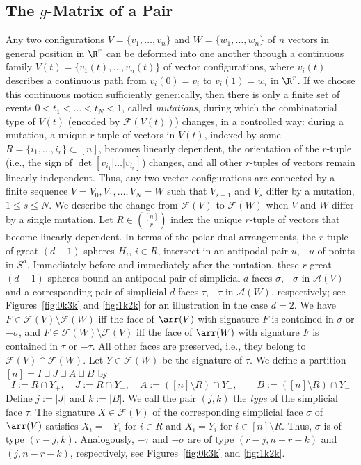 \subsection{The $g$-Matrix of a Pair}
\label{sec:g-pair}
%
Any two configurations $V=\{v_1,\dots,v_n\}$ and $W=\{w_1,\dots,w_n\}$ of $n$ vectors in general position in $\R^r$ can be deformed into one another through a continuous family $V(t)=\{v_1(t),\dots,v_n(t)\}$ of vector configurations, where $v_i(t)$ describes a continuous path from $v_i(0)=v_i$ to $v_i(1)=w_i$ in $\R^r$. If we choose this continuous motion sufficiently generically, then there is only a finite set of events $0 < t_1 < \dots < t_N < 1$, called \emph{mutations}, during which the combinatorial type of $V(t)$ (encoded by $\mathcal{F}(V(t))$) changes, 
in a controlled way: during a mutation, a unique $r$-tuple of vectors in $V(t)$, indexed by some $R=\{i_1,\dots,i_r\} \subset [n]$, becomes linearly dependent, the orientation of the $r$-tuple (i.e., the sign of 
$\det[v_{i_1}|\dots | v_{i_r}]$) changes, and all other $r$-tuples of vectors remain linearly independent. Thus, any two vector configurations are connected by a finite sequence $V=V_0,V_1,\dots,V_N=W$ such that $V_{s-1}$ and $V_s$ differ by a mutation, $1\leq s\leq N$. 
We describe the change from $\mathcal{F}(V)$ to $\mathcal{F}(W)$ when $V$ and $W$ differ by a single mutation. Let $R\in \binom{[n]}{r}$ index the unique $r$-tuple of vectors that become linearly dependent. In terms of the polar dual arrangements, the $r$-tuple of great $(d-1)$-spheres $H_i$, $i\in R$, intersect in an antipodal pair $u,-u$ of points in $S^d$. Immediately before and immediately after the mutation, these $r$ great $(d-1)$-spheres bound an antipodal pair of simplicial $d$-faces $\sigma,-\sigma$ in $\mathcal{A}(V)$ and a corresponding pair of simplicial $d$-faces $\tau,-\tau$ in $\mathcal{A}(W)$, respectively; see Figures~\ref{fig:0k3k} and \ref{fig:1k2k} for an illustration in the case $d=2$. We have $F\in \mathcal{F}(V)\setminus \mathcal{F}(W)$ iff the face of $\arr(V)$ with signature $F$ is contained in $\sigma$ or $-\sigma$, and $F\in \mathcal{F}(W)\setminus \mathcal{F}(V)$ iff the face of $\arr(W)$  with signature $F$ is contained in $\tau$ or $-\tau$. All other faces are preserved, i.e., they belong to $\mathcal{F}(V) \cap \mathcal{F}(W)$. 
%
Let $Y\in \mathcal{F}(W)$ be the signature of $\tau$. We define a partition $[n] = I \sqcup J \sqcup A \sqcup B$ by 
\[I:=R \cap Y_+, \quad J:=R \cap Y_-, \quad A:=([n]\setminus R) \cap Y_+ ,\qquad B:=([n]\setminus R) \cap Y_-\]
Define $j:=|J|$ and $k:=|B|$. We call the pair $(j,k)$ the \emph{type} of the simplicial face $\tau$. The signature $X\in \mathcal{F}(V)$ of the corresponding simplicial face $\sigma$ of $\arr(V)$ satisfies $X_i = -Y_i$ for $i \in R$ and $X_i = Y_i$ for $i\in [n]\setminus R$. Thus, $\sigma$ is of type $(r-j,k)$. Analogously, $-\tau$ and $-\sigma$ are of type $(r-j,n-r-k)$ and $(j,n-r-k)$, respectively, see Figures~\ref{fig:0k3k} and \ref{fig:1k2k}. 
